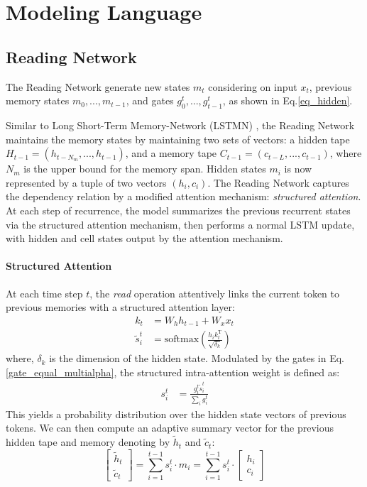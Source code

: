 \documentclass{article} \usepackage{iclr2018_conference,times}
\begin{document}
\section{Modeling Language}
\subsection{Reading Network} \label{sec_reading}
The Reading Network generate new states $m_t$ considering on input $x_t$, previous memory states $m_0,...,m_{t-1}$, and gates $g_0^t,...,g_{t-1}^t$, as shown in Eq.\ref{eq_hidden}.

Similar to Long Short-Term Memory-Network (LSTMN) \citep{cheng2016long}, the Reading Network maintains the memory states by maintaining two sets of vectors: a hidden tape $H_{t-1} = \left( h_{t-N_m}, ..., h_{t-1} \right)$, and a memory tape $C_{t-1} = \left( c_{t-L}, ..., c_{t-1} \right)$, where $N_m$ is the upper bound for the memory span. Hidden states $m_i$ is now represented by a tuple of two vectors $(h_i, c_i)$. The Reading Network captures the dependency relation by a modified attention mechanism: \emph{structured attention}. At each step of recurrence, the model summarizes the previous recurrent states via the structured attention mechanism, then performs a normal LSTM update, with hidden and cell states output by the attention mechanism. 

\paragraph{Structured Attention} At each time step $t$, the \textit{read} operation attentively links the current token to previous memories with a structured attention layer:
\begin{align}
k_t &= W_h h_{t-1} + W_x x_t \\
\tilde{s}_i^t &= \mathrm{softmax}(\frac{h_i k_t^{\mathrm{T}}}{\sqrt{\delta_k}})
\end{align}
where, $\delta_k$ is the dimension of the hidden state. 
Modulated by the gates in Eq.\ref{gate_equal_multialpha}, the structured intra-attention weight is defined as:
\begin{align}
s_i^t &= \frac{g_i^t \tilde{s}_i^t}{\sum_i g_i^t}
\end{align}
This yields a probability distribution over the hidden state vectors of previous tokens. 
We can then compute an adaptive summary vector for the previous hidden tape and memory denoting by $\tilde { h } _{ t }$ and $\tilde { c } _{ t }$:
\begin{equation}
\left[ \begin{matrix} \tilde { h } _{ t } \\ \tilde { c } _{ t } \end{matrix} \right] = \sum _{ i=1 }^{ t-1 } s_{ i }^{ t }\cdot m_i = \sum _{ i=1 }^{ t-1 } s_{ i }^{ t }\cdot \left[ \begin{matrix} h_i \\ c_i \end{matrix} \right] 
\end{equation}
\end{document}
